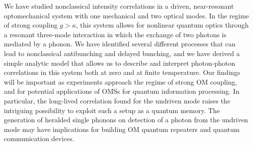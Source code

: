 We have studied  nonclassical intensity correlations in a
driven, near-resonant 
optomechanical system with  one mechanical and two optical modes.
In the regime of strong coupling $g > \kappa$, this system
allows for nonlinear quantum optics through a resonant three-mode 
interaction in which the exchange of two photons is mediated by a phonon.
We have identified several different processes
that can lead to nonclassical antibunching and delayed bunching, 
and we have  
derived a simple analytic model that allows us to 
describe and interpret photon-photon correlations in this 
system both at zero and at finite temperature. 
Our findings will be important as experiments
approach the regime of strong 
OM coupling, and for potential applications of 
OMSs for quantum information processing. 
%
In particular, the long-lived
correlation found for the undriven mode 
raises the intriguing possibility to
exploit such a setup as a quantum memory.
The generation of
heralded single phonons on detection
of a photon from the undriven mode may have implications
for building OM quantum 
repeaters and quantum communication devices.





